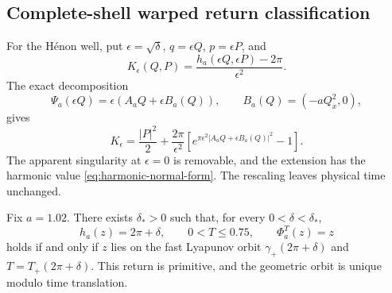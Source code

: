 \subsection{Complete-shell warped return classification}

For the H\'enon well, put \(\epsilon=\sqrt\delta\),
\(q=\epsilon Q\), \(p=\epsilon P\), and
\begin{equation}
 K_\epsilon(Q,P)
 =\frac{h_a(\epsilon Q,\epsilon P)-2\pi}{\epsilon^2}.
 \label{eq:normalized-hamiltonian}
\end{equation}
The exact decomposition
\begin{equation}
 \Psi_a(\epsilon Q)
 =\epsilon(A_aQ+\epsilon B_a(Q)),
 \qquad B_a(Q)=(-aQ_x^2,0),
 \label{eq:normalized-henon}
\end{equation}
gives
\begin{equation}
 K_\epsilon
 =\frac{|P|^2}{2}
 +\frac{2\pi}{\epsilon^2}
 \left[e^{\pi\epsilon^2|A_aQ+\epsilon B_a(Q)|^2}-1\right].
 \label{eq:normalized-k}
\end{equation}
The apparent singularity at \(\epsilon=0\) is removable, and the extension
has the harmonic value \cref{eq:harmonic-normal-form}.  The rescaling leaves
physical time unchanged.

\begin{theorem}
\label{thm:whole-shell}
Fix \(a=1.02\).  There exists \(\delta_*>0\) such that, for every
\(0<\delta<\delta_*\),
\begin{equation}
 h_a(z)=2\pi+\delta,\qquad 0<T\le0.75,\qquad \Phi_a^T(z)=z
 \label{eq:short-return-system}
\end{equation}
holds if and only if \(z\) lies on the fast Lyapunov orbit
\(\gamma_+(2\pi+\delta)\) and
\(T=T_+(2\pi+\delta)\).  This return is primitive, and the geometric orbit
is unique modulo time translation.
\end{theorem}

